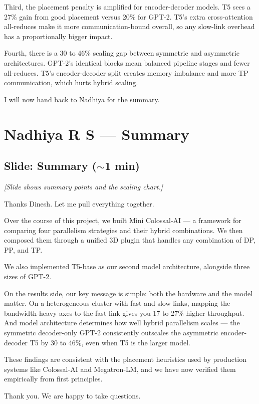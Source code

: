 \documentclass[11pt, a4paper]{article}
\begin{document}
Third, the placement penalty is amplified for encoder-decoder models. T5 sees a 27\% gain from good placement versus 20\% for GPT-2. T5's extra cross-attention all-reduces make it more communication-bound overall, so any slow-link overhead has a proportionally bigger impact.

Fourth, there is a 30 to 46\% scaling gap between symmetric and asymmetric architectures. GPT-2's identical blocks mean balanced pipeline stages and fewer all-reduces. T5's encoder-decoder split creates memory imbalance and more TP communication, which hurts hybrid scaling.

I will now hand back to Nadhiya for the summary.

\section{Nadhiya R S --- Summary}

\subsection{Slide: Summary ($\sim$1 min)}
\textit{[Slide shows summary points and the scaling chart.]}

Thanks Dinesh. Let me pull everything together.

Over the course of this project, we built Mini Colossal-AI --- a framework for comparing four parallelism strategies and their hybrid combinations. We then composed them through a unified 3D plugin that handles any combination of DP, PP, and TP.

We also implemented T5-base as our second model architecture, alongside three sizes of GPT-2.

On the results side, our key message is simple: both the hardware and the model matter. On a heterogeneous cluster with fast and slow links, mapping the bandwidth-heavy axes to the fast link gives you 17 to 27\% higher throughput. And model architecture determines how well hybrid parallelism scales --- the symmetric decoder-only GPT-2 consistently outscales the asymmetric encoder-decoder T5 by 30 to 46\%, even when T5 is the larger model.

These findings are consistent with the placement heuristics used by production systems like Colossal-AI and Megatron-LM, and we have now verified them empirically from first principles.

Thank you. We are happy to take questions.
\end{document}
